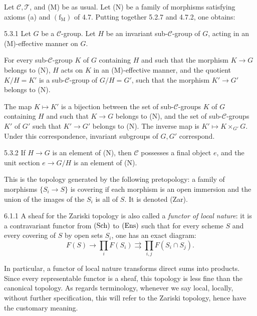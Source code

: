 Let \(\mathcal C,\mathcal T\), and (M) be as usual.
Let (N) be a family of morphisms satisfying axioms (a)
and \((\mathrm f_{\mathrm M})\) of 4.7.
Putting together 5.2.7 and 4.7.2, one obtains:
\begin{proposition}{5.3.1}\label{IV.5.3.1}
Let \(G\) be a \(\mathcal C\)-group. Let \(H\) be an
invariant sub-\(\mathcal C\)-group of \(G\), acting
in an (M)-effective manner on \(G\).

For every sub-\(\mathcal C\)-group \(K\) of \(G\)
containing \(H\) and such that the morphism \(K\to G\)
belongs to (N), \(H\) acts on \(K\) in an (M)-effective
manner, and the quotient \(K/H=K'\) is a
sub-\(\mathcal C\)-group of \(G/H=G'\), such that
the morphism \(K'\to G'\) belongs to (N).

The map \(K\mapsto K'\) is a bijection between
the set of sub-\(\mathcal C\)-groups \(K\) of \(G\)
containing \(H\) and such that \(K\to G\) belongs
to (N), and the set of sub-\(\mathcal C\)-groups
\(K'\) of \(G'\) such that \(K'\to G'\) belongs
to (N). The inverse map is \(K'\mapsto K\times_{G'}G\).
Under this correspondence, invariant subgroups of
\(G,G'\) correspond.
\end{proposition}
\begin{corollary}{5.3.2}\label{IV.5.3.2}
If \(H\to G\) is an element of (N), then
\(\mathcal C\) possesses a final object \(e\),
and the unit section \(e\to G/H\) is an element of (N).
\end{corollary}

This is the topology generated by the following pretopology:
a family of morphisms \(\{S_i\to S\}\) is covering
if each morphism is an open immersion and the union
of the images of the \(S_i\) is all of \(S\).
It is denoted (Zar).
\begin{definition}{6.1.1}\label{IV.6.1.1}
A sheaf for the Zariski topology is also called
a \emph{functor of local nature}: it is a
contravariant functor from \(\textup{(Sch)}\) to \(\textup{(Ens)}\)
such that for every scheme \(S\) and every covering
of \(S\) by open sets \(S_i\), one has an exact diagram:
\[
F(S)\longrightarrow\prod_i F(S_i)
\rightrightarrows\prod_{i,j}F(S_i\cap S_j).
\]
\end{definition}
In particular, a functor of local nature transforms
direct sums into products. Since every representable
functor is a sheaf, this topology is less fine than
the canonical topology.
As regards terminology, whenever we say \og local\fg,
\og locally\fg, without further specification, this
will refer to the Zariski topology, hence have the
customary meaning.

